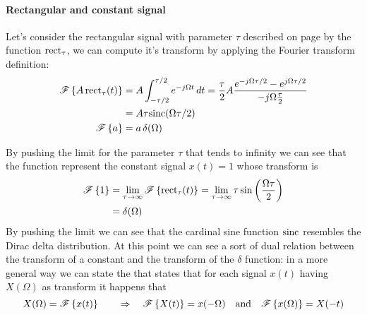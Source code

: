 	\paragraph{Rectangular and constant signal} Let's consider the rectangular signal with parameter $\tau$ described on page \pageref{eq:intro:rect} by the function $\textrm{rect}_\tau$, we can compute it's transform by applying the Fourier transform definition:
	\begin{align*}
			\mathscr{F}\left\{ A \, \textrm{rect}_\tau(t) \right\}	& =	 A \int_{-\tau/2}^{\tau/2} e ^{-j\Omega t} \, dt = \frac \tau 2 A \frac{e^{-j\Omega \tau/2} - e^{j\Omega \tau/2}}{-j\Omega \frac \tau 2} \\ & = A \tau \textrm{sinc} (\Omega \tau/2) \\
			\mathscr{F}\left\{ a \right\} & = a \, \delta(\Omega)
	\end{align*}
	
	By pushing the limit for the parameter $\tau$ that tends to infinity we can see that the function represent the constant signal $x(t) = 1$ whose transform is
	\begin{align*}
		\mathscr{F}\left\{ 1 \right\} & = \lim_{\tau\rightarrow \infty} \mathscr{F}\left\{ \textrm{rect}_\tau(t) \right\} = \lim_{\tau\rightarrow \infty} \tau \sin\left(   \frac{\Omega \tau}{2}\right) \\ & = \delta(\Omega)
	\end{align*}
	By pushing the limit we can see that the cardinal sine function $\textrm{sinc}$ resembles the Dirac delta distribution. At this point we can see a sort of dual relation between the transform of a constant and the transform of the $\delta$ function: in a more general way we can state the  that states that for each signal $x(t)$ having $X(\Omega)$ as transform it happens that
	\begin{equation}
		X(\Omega) = \mathscr{F}\left\{ x(t) \right\} \qquad \Rightarrow \quad \mathscr{F}\left\{ X(t) \right\} = x(-\Omega) \quad \textrm{and} \quad \mathscr{F}\left\{ x(\Omega) \right\} = X(-t)
	\end{equation}
	
